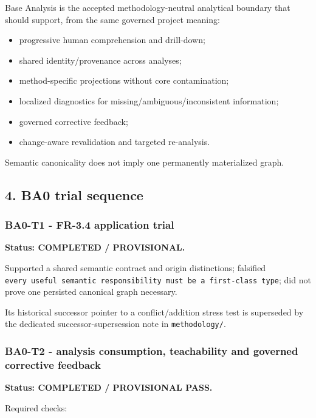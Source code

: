 \documentclass[
  10pt,
  a4paper,
]{article}
\providecommand{\tightlist}{%
  \setlength{\itemsep}{0pt}\setlength{\parskip}{0pt}}
\begin{document}
Base Analysis is the accepted methodology-neutral analytical boundary
that should support, from the same governed project meaning:

\begin{itemize}
\tightlist
\item
  progressive human comprehension and drill-down;
\item
  shared identity/provenance across analyses;
\item
  method-specific projections without core contamination;
\item
  localized diagnostics for missing/ambiguous/inconsistent information;
\item
  governed corrective feedback;
\item
  change-aware revalidation and targeted re-analysis.
\end{itemize}

Semantic canonicality does not imply one permanently materialized graph.

\subsection{4. BA0 trial sequence}\label{4-ba0-trial-sequence}

\subsubsection{BA0-T1 - FR-3.4 application
trial}\label{ba0-t1---fr-34-application-trial}

\textbf{Status: COMPLETED / PROVISIONAL.}

Supported a shared semantic contract and origin distinctions; falsified
\texttt{every\ useful\ semantic\ responsibility\ must\ be\ a\ first-class\ type};
did not prove one persisted canonical graph necessary.

Its historical successor pointer to a conflict/addition stress test is
superseded by the dedicated successor-supersession note in
\texttt{methodology/}.

\subsubsection{BA0-T2 - analysis consumption, teachability and governed
corrective
feedback}\label{ba0-t2---analysis-consumption-teachability-and-governed-corrective-feedback}

\textbf{Status: COMPLETED / PROVISIONAL PASS.}

Required checks:
\end{document}
